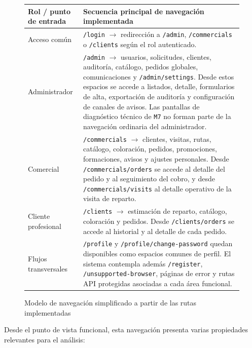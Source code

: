 \begin{figure}[H]
    \centering
    \renewcommand{\arraystretch}{1.25}
    \begin{tabularx}{\textwidth}{|p{}|X|}
        \hline
        \textbf{Rol / punto de entrada} & \textbf{Secuencia principal de navegación implementada} \\
        \hline
        Acceso común & \texttt{/login} $\rightarrow$ redirección a \texttt{/admin}, \texttt{/commercials} o \texttt{/clients} según el rol autenticado. \\
        \hline
        Administrador & \texttt{/admin} $\rightarrow$ usuarios, solicitudes, clientes, auditoría, catálogo, pedidos globales, comunicaciones y \texttt{/admin/settings}. Desde estos espacios se accede a listados, detalle, formularios de alta, exportación de auditoría y configuración de canales de avisos. Las pantallas de diagnóstico técnico de \texttt{M7} no forman parte de la navegación ordinaria del administrador. \\
        \hline
        Comercial & \texttt{/commercials} $\rightarrow$ clientes, visitas, rutas, catálogo, coloración, pedidos, promociones, formaciones, avisos y ajustes personales. Desde \texttt{/commercials/orders} se accede al detalle del pedido y al seguimiento del cobro, y desde \texttt{/commercials/visits} al detalle operativo de la visita de reparto. \\
        \hline
        Cliente profesional & \texttt{/clients} $\rightarrow$ estimación de reparto, catálogo, coloración y pedidos. Desde \texttt{/clients/orders} se accede al historial y al detalle de cada pedido. \\
        \hline
        Flujos transversales & \texttt{/profile} y \texttt{/profile/change-password} quedan disponibles como espacios comunes de perfil. El sistema contempla además \texttt{/register}, \texttt{/unsupported-browser}, páginas de error y rutas API protegidas asociadas a cada área funcional. \\
        \hline
    \end{tabularx}
    \caption{Modelo de navegación simplificado a partir de las rutas implementadas}
    \label{fig:NavigationModel}
\end{figure}

Desde el punto de vista funcional, esta navegación presenta varias propiedades relevantes para el análisis:

